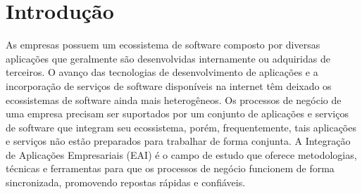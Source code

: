 \section{Introdu\c{c}\~{a}o}
\label{sec:introducao}
	


\noindent 
As empresas possuem um ecossistema de software composto por diversas aplicações que geralmente são desenvolvidas internamente ou adquiridas de terceiros. O avanço das tecnologias de desenvolvimento de aplicações e a incorporação de serviços de software disponíveis na internet têm deixado os ecossistemas de software ainda mais heterogêneos. Os processos de negócio de uma empresa precisam ser suportados por um conjunto de aplicações e serviços de software que integram seu ecossistema, porém, frequentemente, tais aplicações e serviços não estão preparados para trabalhar de forma conjunta. A Integração de Aplicações Empresariais (EAI) é o campo de estudo que oferece metodologias, técnicas e ferramentas para que os processos de negócio funcionem de forma sincronizada, promovendo repostas rápidas e confiáveis.  

